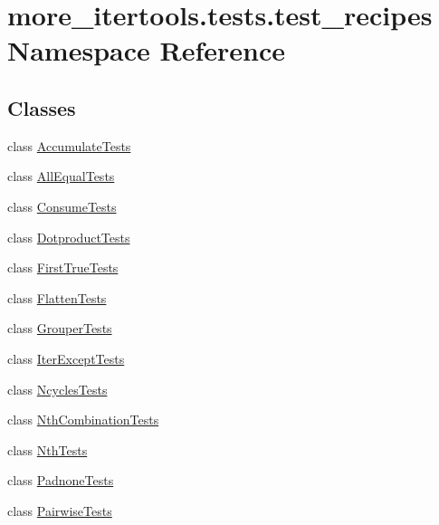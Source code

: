 \hypertarget{namespacemore__itertools_1_1tests_1_1test__recipes}{}\section{more\+\_\+itertools.\+tests.\+test\+\_\+recipes Namespace Reference}
\label{namespacemore__itertools_1_1tests_1_1test__recipes}
\subsection*{Classes}
\begin{DoxyCompactItemize}
\item 
class \hyperlink{classmore__itertools_1_1tests_1_1test__recipes_1_1_accumulate_tests}{Accumulate\+Tests}
\item 
class \hyperlink{classmore__itertools_1_1tests_1_1test__recipes_1_1_all_equal_tests}{All\+Equal\+Tests}
\item 
class \hyperlink{classmore__itertools_1_1tests_1_1test__recipes_1_1_consume_tests}{Consume\+Tests}
\item 
class \hyperlink{classmore__itertools_1_1tests_1_1test__recipes_1_1_dotproduct_tests}{Dotproduct\+Tests}
\item 
class \hyperlink{classmore__itertools_1_1tests_1_1test__recipes_1_1_first_true_tests}{First\+True\+Tests}
\item 
class \hyperlink{classmore__itertools_1_1tests_1_1test__recipes_1_1_flatten_tests}{Flatten\+Tests}
\item 
class \hyperlink{classmore__itertools_1_1tests_1_1test__recipes_1_1_grouper_tests}{Grouper\+Tests}
\item 
class \hyperlink{classmore__itertools_1_1tests_1_1test__recipes_1_1_iter_except_tests}{Iter\+Except\+Tests}
\item 
class \hyperlink{classmore__itertools_1_1tests_1_1test__recipes_1_1_ncycles_tests}{Ncycles\+Tests}
\item 
class \hyperlink{classmore__itertools_1_1tests_1_1test__recipes_1_1_nth_combination_tests}{Nth\+Combination\+Tests}
\item 
class \hyperlink{classmore__itertools_1_1tests_1_1test__recipes_1_1_nth_tests}{Nth\+Tests}
\item 
class \hyperlink{classmore__itertools_1_1tests_1_1test__recipes_1_1_padnone_tests}{Padnone\+Tests}
\item 
class \hyperlink{classmore__itertools_1_1tests_1_1test__recipes_1_1_pairwise_tests}{Pairwise\+Tests}

\end{DoxyCompactItemize}
